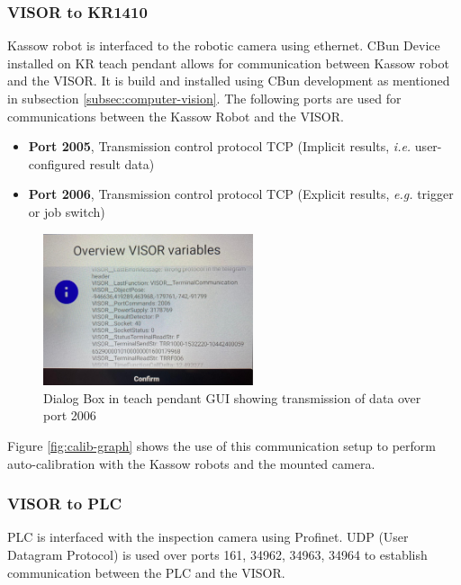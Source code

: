 \subsubsection{VISOR to KR1410}
Kassow robot is interfaced to the robotic camera using ethernet.
CBun Device installed on KR teach pendant allows for communication between
Kassow robot and the VISOR. It is build and installed using CBun development as mentioned in subsection \ref{subsec:computer-vision}. The following ports are used for communications between the Kassow Robot and the VISOR. 

\begin{itemize}
  \item \textbf{Port 2005}, Transmission control protocol TCP (Implicit results, \textit{i.e.} user-configured result data)
  \item \textbf{Port 2006}, Transmission control protocol TCP (Explicit results, \textit{e.g.} trigger or job switch)
\end{itemize}


\begin{figure}[h]
  \centering
  \includegraphics[width=0.55\textwidth]{figures/visor-cbun-connection.png}
  \caption{Dialog Box in teach pendant GUI showing transmission of data over port 2006}
  \label{fig:cbun-variables}
\end{figure}

Figure \ref{fig:calib-graph} shows the use of this communication setup to perform auto-calibration with the Kassow robots and the mounted camera.

\subsubsection{VISOR to PLC}
PLC is interfaced with the inspection camera using Profinet.
UDP (User Datagram Protocol) is used over ports 161, 34962, 34963, 34964 to establish communication between the PLC and the VISOR. \cite{visor_communication_manual}



